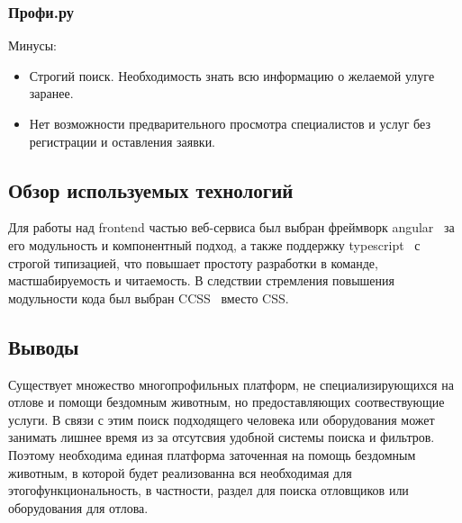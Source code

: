 \subsubsection{Профи.ру}
  Минусы:
  \begin{itemize}
    \item Строгий поиск. Необходимость знать всю информацию о желаемой улуге заранее.
    \item Нет возможности предварительного просмотра специалистов и услуг без регистрации и оставления заявки.
  \end{itemize}



\subsection{Обзор используемых технологий}
Для работы над frontend частью веб-сервиса был выбран фреймворк angular~\cite{angularLanguage} за его
модульность и компонентный подход, а также поддержку typescript~\cite{typescriptLanguage} с строгой типизацией,
что повышает простоту разработки в команде, мастшабируемость и читаемость.
В следствии стремления повышения модульности кода был выбран CCSS~\cite{ccssLanguage} вместо CSS.

\subsection{Выводы}

Существует множество многопрофильных платформ, не специализирующихся на отлове и помощи бездомным животным, но предоставляющих соотвествующие услуги.
В связи с этим поиск подходящего человека или оборудования может занимать лишнее время из за отсутсвия удобной системы поиска и фильтров.
Поэтому необходима единая платформа заточенная на помощь бездомным животным, в которой будет реализованна вся необходимая для этогофункциональность, в частности, раздел для поиска отловщиков или оборудования для отлова.
